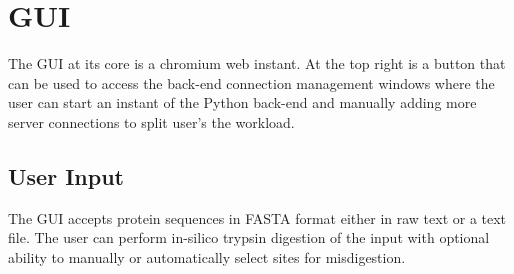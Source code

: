 \documentclass[10pt,a4paper]{memoir}
\begin{document}
\section{GUI}
The GUI at its core is a chromium web instant. At the top right is a button that can be used to access the back-end connection management windows where the user can start an instant of the Python back-end and manually adding more server connections to split user's the workload.\par
\subsection{User Input}
The GUI accepts protein sequences in FASTA format either in raw text or a text file. The user can perform in-silico trypsin digestion of the input with optional ability to manually or automatically select sites for misdigestion. 
\end{document}
